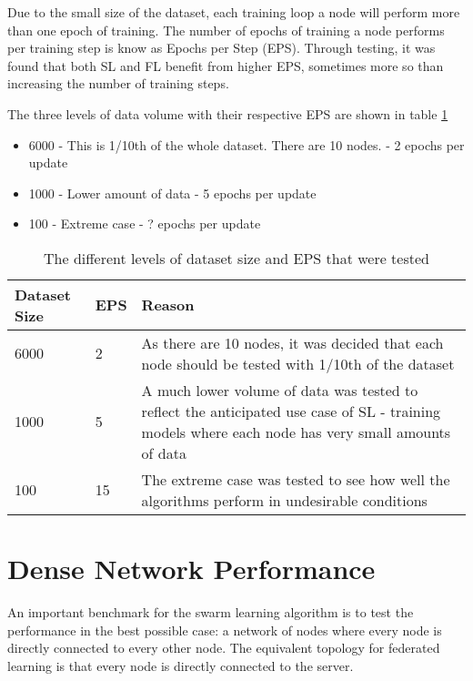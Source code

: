 Due to the small size of the dataset, each training loop a node will perform more than one epoch of training. The number of epochs of training a node performs per training step is know as Epochs per Step (EPS). Through testing, it was found that both SL and FL benefit from higher EPS, sometimes more so than increasing the number of training steps.

The three levels of data volume with their respective EPS are shown in table \ref{epsparams}
\begin{itemize}
	\item 6000 - This is 1/10th of the whole dataset. There are 10 nodes. - 2 epochs per update
	\item 1000 - Lower amount of data - 5 epochs per update
	\item 100 - Extreme case - ? epochs per update
\end{itemize}

\begin{table}[H]
	\begin{tabular}{p{1.5cm}|l|p{10cm}}
		Dataset Size & EPS & Reason \\ \hline \hline
		6000  & 2  & As there are 10 nodes, it was decided that each node should be tested with 1/10th of the dataset \\ \hline
		1000   & 5   & A much lower volume of data was tested to reflect the anticipated use case of SL - training models where each node has very small amounts of data \\ \hline
		100  & 15  & The extreme case was tested to see how well the algorithms perform in undesirable conditions	\end{tabular}
	\caption{The different levels of dataset size and EPS that were tested} \label{epsparams}
\end{table}

\section{Dense Network Performance}
An important benchmark for the swarm learning algorithm is to test the performance in the best possible case: a network of nodes where every node is directly connected to every other node. The equivalent topology for federated learning is that every node is directly connected to the server.

